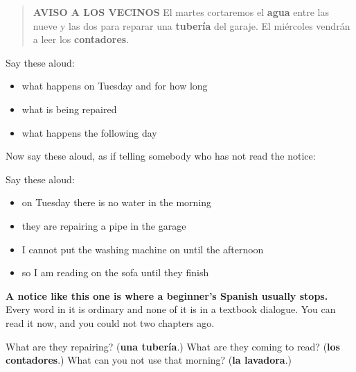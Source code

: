 \begin{quote}
\textbf{AVISO A LOS VECINOS} El martes cortaremos el \textbf{agua} entre las nueve y las dos para reparar una \textbf{tubería} del garaje. El miércoles vendrán a leer los \textbf{contadores}.
\end{quote}

Say these aloud:

\begin{itemize}
\raggedright
  \item what happens on Tuesday and for how long
  \item what is being repaired
  \item what happens the following day
\end{itemize}

\begin{grammarlens}[title={What you've built}]
Now say these aloud, as if telling somebody who has not read the notice:

Say these aloud:

\begin{itemize}
\raggedright
  \item on Tuesday there is no water in the morning
  \item they are repairing a pipe in the garage
  \item I cannot put the washing machine on until the afternoon
  \item so I am reading on the sofa until they finish
\end{itemize}

\textbf{A notice like this one is where a beginner's Spanish usually stops.} Every word in it is ordinary and none of it is in a textbook dialogue. You can read it now, and you could not two chapters ago.
\end{grammarlens}

\begin{tcolorbox}[breakable,colback=teal!4,colframe=teal!35!black,title={Before you move on}]
What are they repairing? (\textbf{una tubería}.) What are they coming to read? (\textbf{los contadores}.) What can you not use that morning? (\textbf{la lavadora}.)
\end{tcolorbox}

